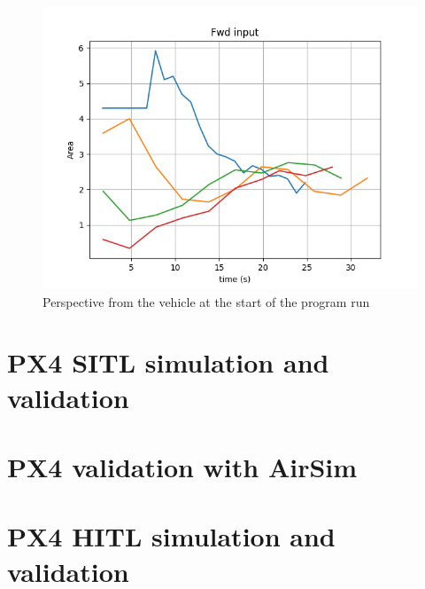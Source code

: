 \begin{figure}
  \centering
  \includegraphics[width=.8\textwidth, keepaspectratio]{img/4.1-tune/fwd_validate_1.png}
  \caption{Perspective from the vehicle at the start of the program run}\label{fig:sim_camera_tune}
\end{figure}


\section{PX4 SITL simulation and validation}
\label{sec:test-2-sitl}


\section{PX4 validation with AirSim}
\label{sec:test-3-airsim}


\section{PX4 HITL simulation and validation}
\label{sec:test-4-hitl}

